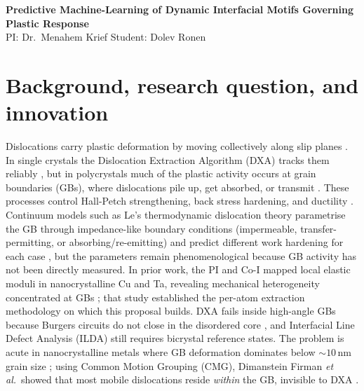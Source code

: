 \documentclass[11pt]{article}
\begin{document}
\begin{center}
{\Large \textbf{Predictive Machine-Learning of Dynamic Interfacial Motifs Governing Plastic Response}}\\

\vspace{0.3em}
{\normalsize PI: Dr.\ Menahem Krief \quad Student: Dolev Ronen}\\
\vspace{0.3em}
\end{center}

\section*{Background, research question, and innovation}

Dislocations carry plastic deformation by moving collectively along slip planes \cite{Cordero2016}.
In single crystals the Dislocation Extraction Algorithm (DXA) tracks them reliably \cite{Stukowski2012}, but in polycrystals much of the plastic activity occurs at grain boundaries (GBs), where dislocations pile up, get absorbed, or transmit \cite{Piao2022,Liu2020,DGI2025}.
These processes control Hall-Petch strengthening, back stress hardening, and ductility \cite{Cordero2016,Gao2022,LeBauschinger2018}.
Continuum models such as Le's thermodynamic dislocation theory parametrise the GB through impedance-like boundary conditions (impermeable, transfer-permitting, or absorbing/re-emitting) and predict different work hardening for each case \cite{Piao2022,LeBauschinger2018}, but the parameters remain phenomenological because GB activity has not been directly measured.
In prior work, the PI and Co-I mapped local elastic moduli in nanocrystalline Cu and Ta, revealing mechanical heterogeneity concentrated at GBs \cite{Krief2024}; that study established the per-atom extraction methodology on which this proposal builds.
DXA fails inside high-angle GBs because Burgers circuits do not close in the disordered core \cite{Stukowski2012}, and Interfacial Line Defect Analysis (ILDA) \cite{Deka2023} still requires bicrystal reference states.
The problem is acute in nanocrystalline metals where GB deformation dominates below ${\sim}10$\,nm grain size \cite{Gupta2020}; using Common Motion Grouping (CMG), Dimanstein Firman \emph{et al.}\ showed that most mobile dislocations reside \emph{within} the GB, invisible to DXA \cite{Firman2024}.
\end{document}
